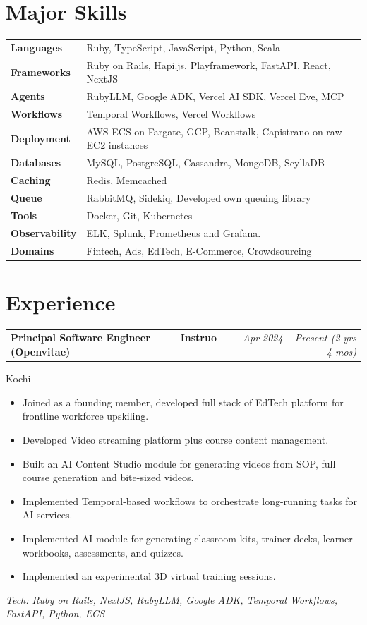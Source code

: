 \documentclass[10.5pt,a4paper]{article}
\makeatletter
\newcommand{\jobheader}[3]{%
  \noindent
  \begin{tabular*}{\textwidth}{@{\extracolsep{\fill}}l r}
    \textbf{\large #1} & {\itshape\color{lightgray} #3} \\
  \end{tabular*}\par
}
\newcommand{\jobentry}[4]{%
  \jobheader{#1 \ --- \ \textbf{#2}}{}{#3}
  {\color{graytext} #4}\par\vspace{2pt}
}
\newcommand{\techline}[1]{%
  {\small\itshape\color{blue} Tech: #1}\par\vspace{6pt}
}
\makeatother
\begin{document}
\section{Major Skills}
\begin{tabular}{@{}p{2.05in}p{4.85in}@{}}
\textbf{Languages} & Ruby, TypeScript, JavaScript, Python, Scala \\[4pt]
\textbf{Frameworks} & Ruby on Rails, Hapi.js, Playframework, FastAPI, React, NextJS \\[4pt]
\textbf{Agents} & RubyLLM, Google ADK, Vercel AI SDK, Vercel Eve, MCP \\[4pt]
\textbf{Workflows} & Temporal Workflows, Vercel Workflows \\[4pt]
\textbf{Deployment} & AWS ECS on Fargate, GCP, Beanstalk, Capistrano on raw EC2 instances \\[4pt]
\textbf{Databases} & MySQL, PostgreSQL, Cassandra, MongoDB, ScyllaDB \\[4pt]
\textbf{Caching} & Redis, Memcached \\[4pt]
\textbf{Queue} & RabbitMQ, Sidekiq, Developed own queuing library \\[4pt]
\textbf{Tools} & Docker, Git, Kubernetes \\
\textbf{Observability} & ELK, Splunk, Prometheus and Grafana. \\
\textbf{Domains} & Fintech, Ads, EdTech, E-Commerce, Crowdsourcing \\
\end{tabular}

\section{Experience}

\jobentry{Principal Software Engineer}{Instruo (Openvitae)}{Apr 2024 -- Present (2 yrs 4 mos)}{Kochi}
\begin{itemize}[leftmargin=16pt, itemsep=1pt, topsep=2pt, parsep=0pt]
  \item Joined as a founding member, developed full stack of EdTech platform for frontline workforce upskiling.
  \item Developed Video streaming platform plus course content management.
  \item Built an AI Content Studio module for generating videos from SOP, full course generation and bite-sized videos.
  \item Implemented Temporal-based workflows to orchestrate long-running tasks for AI services.
  \item Implemented AI module for generating classroom kits, trainer decks, learner workbooks, assessments, and quizzes.
  \item Implemented an experimental 3D virtual training sessions.
\end{itemize}
\techline{Ruby on Rails, NextJS, RubyLLM, Google ADK, Temporal Workflows, FastAPI, Python, ECS}
\end{document}
